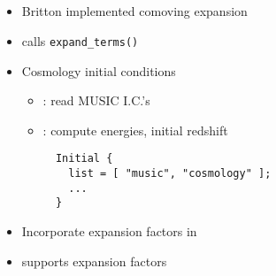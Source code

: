 \NEWSEC

\subsection{\ssRecentExpansion}

\begin{frame}[fragile,label=ss-recent-expansion] 
\secframetitle{\ssRecentExpansion}
\begin{itemize}
\item Britton implemented comoving expansion
\item {} calls \verb+expand_terms()+
\item Cosmology initial conditions
\begin{itemize}
\item {}: read MUSIC I.C.'s
\item {}: compute energies, initial redshift
\begin{verbatim}
  Initial {
    list = [ "music", "cosmology" ];
    ...
  }
\end{verbatim}
\end{itemize}
\item Incorporate expansion factors in 
\item {} supports expansion factors
\end{itemize}
\end{frame}



